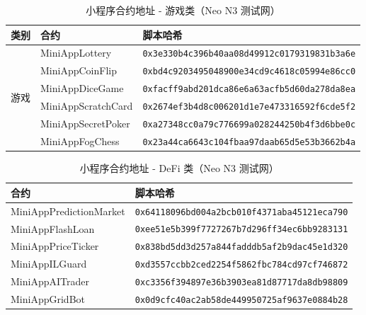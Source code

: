 \documentclass[11pt,a4paper]{article}
\begin{document}
\begin{table}[h]
\centering
\caption{小程序合约地址 - 游戏类（Neo N3 测试网）}
\scriptsize
\begin{tabular}{@{}lll@{}}
\toprule
\textbf{类别} & \textbf{合约} & \textbf{脚本哈希} \\
\midrule
\multirow{6}{*}{游戏} & MiniAppLottery & \texttt{0x3e330b4c396b40aa08d49912c0179319831b3a6e} \\
 & MiniAppCoinFlip & \texttt{0xbd4c9203495048900e34cd9c4618c05994e86cc0} \\
 & MiniAppDiceGame & \texttt{0xfacff9abd201dca86e6a63acfb5d60da278da8ea} \\
 & MiniAppScratchCard & \texttt{0x2674ef3b4d8c006201d1e7e473316592f6cde5f2} \\
 & MiniAppSecretPoker & \texttt{0xa27348cc0a79c776699a028244250b4f3d6bbe0c} \\
 & MiniAppFogChess & \texttt{0x23a44ca6643c104fbaa97daab65d5e53b3662b4a} \\
\bottomrule
\end{tabular}
\label{tab:miniapps-gaming-addresses}
\end{table}

\begin{table}[h]
\centering
\caption{小程序合约地址 - DeFi 类（Neo N3 测试网）}
\scriptsize
\begin{tabular}{@{}ll@{}}
\toprule
\textbf{合约} & \textbf{脚本哈希} \\
\midrule
MiniAppPredictionMarket & \texttt{0x64118096bd004a2bcb010f4371aba45121eca790} \\
MiniAppFlashLoan & \texttt{0xee51e5b399f7727267b7d296ff34ec6bb9283131} \\
MiniAppPriceTicker & \texttt{0x838bd5dd3d257a844fadddb5af2b9dac45e1d320} \\
MiniAppILGuard & \texttt{0xd3557ccbb2ced2254f5862fbc784cd97cf746872} \\
MiniAppAITrader & \texttt{0xc3356f394897e36b3903ea81d87717da8db98809} \\
MiniAppGridBot & \texttt{0x0d9cfc40ac2ab58de449950725af9637e0884b28} \\
\bottomrule
\end{tabular}
\label{tab:miniapps-defi-addresses}
\end{table}
\end{document}
